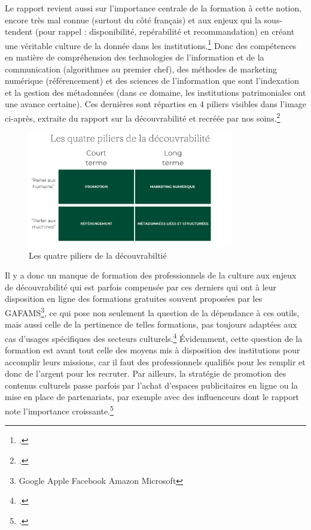 Le rapport revient aussi sur l’importance centrale de la formation à cette notion, encore très mal connue (surtout du côté français) et aux enjeux qui la sous-tendent (pour rappel : disponibilité, repérabilité et recommandation) en créant une véritable culture de la donnée dans les institutions.\footcite[p. 23]{ministeresdelaculturefranceetquebec2020} Donc des compétences en matière de compréhension des technologies de l’information et de la communication (algorithmes au premier chef), des méthodes de marketing numérique (référencement) et des sciences de l’information que sont l’indexation et la gestion des métadonnées (dans ce domaine, les institutions patrimoniales ont une avance certaine). Ces dernières sont réparties en 4 piliers visibles dans l’image ci-après, extraite du rapport sur la découvrabilité et recréée par nos soins.\footcite[p. 21]{ministeresdelaculturefranceetquebec2020}



\begin{figure}[h!]
	\centering
	\includegraphics[width=0.8\textwidth]{images/image26.png}
	\caption{Les quatre piliers de la découvrabiltié}
	\label{fig:image26}
\end{figure}



Il y a donc un manque de formation des professionnels de la culture aux enjeux de découvrabilité qui est parfois compensée par ces derniers qui ont à leur disposition en ligne des formations gratuites souvent proposées par les GAFAMS\footnote{Google Apple Facebook Amazon Microsoft }, ce qui pose non seulement la question de la dépendance à ces outils, mais aussi celle de la pertinence de telles formations, pas toujours adaptées aux cas d’usages spécifiques des secteurs culturels.\footcite[p. 22]{ministeresdelaculturefranceetquebec2020} Évidemment, cette question de la formation est avant tout celle des moyens mis à disposition des institutions pour accomplir leurs missions, car il faut des professionnels qualifiés pour les remplir et donc de l’argent pour les recruter. Par ailleurs, la stratégie de promotion des contenus culturels passe parfois par l’achat d’espaces publicitaires en ligne ou la mise en place de partenariats, par exemple avec des influenceurs dont le rapport note l’importance croissante.\footcite[p. 22]{ministeresdelaculturefranceetquebec2020} 

